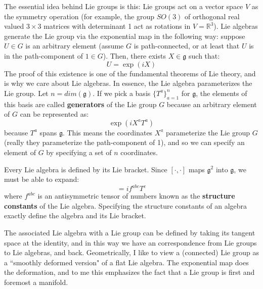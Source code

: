 \documentclass[11pt, oneside]{article}   	%
\theoremstyle{definition}
\begin{document}
The essential idea behind Lie groups is this: Lie groups act on a vector space $V$ as the symmetry 
operation (for example, the group $SO(3)$ of orthogonal real valued $3\times 3$ matrices with 
determinant 1 act as rotations in $V = \mathbb R^3$). Lie algebras generate the Lie group via the 
exponential map in the following way: suppose $U\in G$ 
is an arbitrary element (assume $G$ is path-connected, or at least that $U$ is in the path-component 
of $1\in G$). Then, there exists $X\in\mathfrak g$ such that:
\begin{equation}
	U = \exp(iX)
\end{equation}
The proof of this existence is one of the fundamental theorems of Lie theory, and is why we care 
about Lie algebras. In essence, the Lie algebra parameterizes the Lie group. Let $n = dim(\mathfrak 
g)$. If we pick a basis 
$\{T^a\}_{a = 1}^n$ for $\mathfrak g$, the elements of this basis are called \textbf{generators} of the 
Lie group $G$ because an arbitrary element of $G$ can be represented as:
\begin{equation}
	\exp(i X^a T^a)
\end{equation}
because $T^a$ spans $\mathfrak g$. This means the coordinates $X^a$ parameterize the Lie 
group $G$ (really they parameterize the path-component of 1), and so we can specify an 
element of $G$ by specifying a set of $n$ coordinates. 

Every Lie algebra is defined by its Lie bracket. Since $[\cdot, \cdot]$ maps $\mathfrak g^2$ into 
$\mathfrak g$, we must be able to expand:
\begin{equation}
	[T^a, T^b] = if^{abc}T^c
\end{equation}
where $f^{abc}$ is an antisymmetric tensor of numbers known as the \textbf{structure constants} 
of the Lie algebra. Specifying the structure constants of an algebra exactly define the algebra and 
its Lie bracket. 

The associated Lie algebra with a Lie group can be defined by taking its tangent space at the 
identity, and in this way we have an correspondence from Lie groups to Lie algebras, and back. 
Geometrically, I like to view a (connected) Lie group as a ``smoothly deformed version" of a flat Lie algebra. 
The exponential map does the deformation, and to me this emphasizes the fact that a Lie group is 
first and foremost a manifold. 
\end{document}
